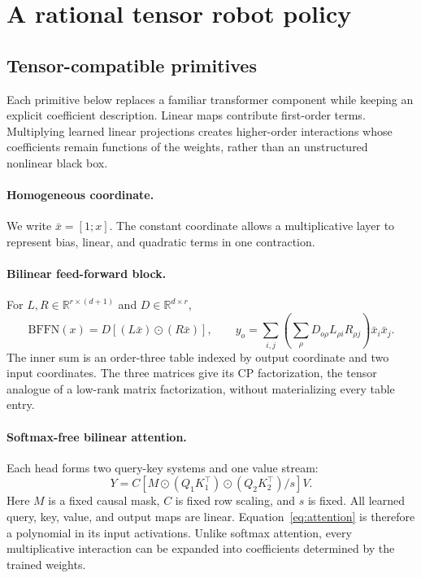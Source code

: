 \documentclass{article}
\newcommand{\R}{\mathbb{R}}
\begin{document}
\section{A rational tensor robot policy}
\label{sec:model}

\subsection{Tensor-compatible primitives}

Each primitive below replaces a familiar transformer component while keeping an explicit
coefficient description. Linear maps contribute first-order terms. Multiplying learned linear
projections creates higher-order interactions whose coefficients remain functions of the
weights, rather than an unstructured nonlinear black box.

\paragraph{Homogeneous coordinate.}
We write $\bar x=[1;x]$. The constant coordinate allows a multiplicative layer to represent
bias, linear, and quadratic terms in one contraction.

\paragraph{Bilinear feed-forward block.}
For $L,R\in\R^{r\times(d+1)}$ and $D\in\R^{d\times r}$,
\begin{equation}
\mathrm{BFFN}(x)
=D\left[(L\bar x)\odot(R\bar x)\right],
\qquad
y_o=\sum_{i,j}\left(\sum_{\rho}D_{o\rho}L_{\rho i}R_{\rho j}\right)\bar x_i\bar x_j .
\label{eq:bffn}
\end{equation}
The inner sum is an order-three table indexed by output coordinate and two input coordinates.
The three matrices give its CP factorization, the tensor analogue of a low-rank matrix
factorization, without materializing every table entry.

\paragraph{Softmax-free bilinear attention.}
Each head forms two query-key systems and one value stream:
\begin{equation}
Y=C\left[M\odot(Q_1K_1^\top)\odot(Q_2K_2^\top)/s\right]V .
\label{eq:attention}
\end{equation}
Here $M$ is a fixed causal mask, $C$ is fixed row scaling, and $s$ is fixed. All learned
query, key, value, and output maps are linear. Equation~\ref{eq:attention} is therefore a
polynomial in its input activations. Unlike softmax attention, every multiplicative interaction
can be expanded into coefficients determined by the trained weights.
\end{document}
